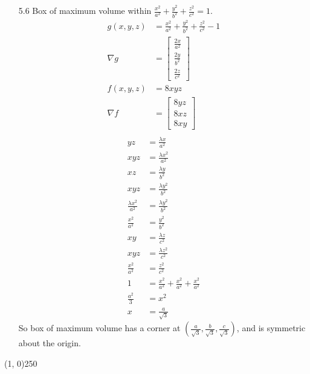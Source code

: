 \documentclass[11pt,letterpaper]{article}
\begin{document}
\begin{enumerate}
\item[5.6]
  Box of maximum volume within
  $\frac{x^2}{a^2}+\frac{y^2}{b^2}+\frac{z^2}{c^2}=1$.
  \begin{align*}
    g(x,y,z) &= \frac{x^2}{a^2}+\frac{y^2}{b^2}+\frac{z^2}{c^2}-1 \\
    \nabla g &= \begin{bmatrix}
                  \frac{2x}{a^2} \\[0.3em]
                  \frac{2y}{b^2} \\[0.3em]
                  \frac{2z}{c^2}
                \end{bmatrix} \\
    f(x,y,z) &= 8xyz \\
    \nabla f &= \begin{bmatrix}
                  8yz \\
                  8xz \\
                  8xy
                \end{bmatrix} \\
  \end{align*}
  \begin{align*}
    yz &= \frac{\lambda x}{a^2} \tag{$\nabla f = \lambda\nabla g$} \\
    xyz &= \frac{\lambda x^2}{a^2} \\
    xz &= \frac{\lambda y}{b^2} \tag{$\nabla f = \lambda\nabla g$} \\
    xyz &= \frac{\lambda y^2}{b^2} \\
    \frac{\lambda x^2}{a^2} &= \frac{\lambda y^2}{b^2} \\
    \frac{x^2}{a^2} &= \frac{y^2}{b^2} \\
    xy &= \frac{\lambda z}{c^2} \tag{$\nabla f = \lambda\nabla g$} \\
    xyz &= \frac{\lambda z^2}{c^2} \\
    \frac{x^2}{a^2} &= \frac{z^2}{c^2} \\
    1 &= \frac{x^2}{a^2}+\frac{x^2}{a^2}+\frac{x^2}{a^2} \\
    \frac{a^2}{3} &= x^2 \\
    x &= \frac{a}{\sqrt{3}}
  \end{align*}
  So box of maximum volume has a corner at
  $\left(\frac{a}{\sqrt{3}},\frac{b}{\sqrt{3}},\frac{c}{\sqrt{3}}\right)$, and
  is symmetric about the origin.
\end{enumerate}

\begin{center}
\line(1, 0){250}
\end{center}
\end{document}
